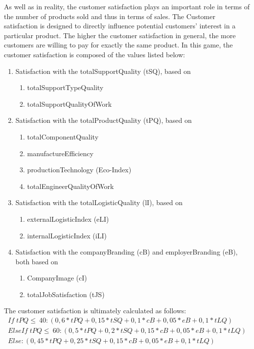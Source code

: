 As well as in reality, the customer satisfaction plays an important role in terms of the number of products sold and thus in terms of sales. %
The Customer satisfaction is designed to directly influence potential customers' interest in a particular product. The higher the customer satisfaction in general, the more customers are willing to pay for exactly the same product. 
In this game, the customer satisfaction is composed of the values listed below:
   \begin{enumerate}
      \item Satisfaction with the totalSupportQuality (tSQ), based on
      \begin{enumerate}
         \item totalSupportTypeQuality
         \item totalSupportQualityOfWork
      \end{enumerate}
      \item Satisfaction with the totalProductQuality (tPQ), based on
      \begin{enumerate}
         \item totalComponentQuality
         \item manufactureEfficiency
         \item productionTechnology (Eco-Index)
         \item totalEngineerQualityOfWork
      \end{enumerate}
      \item Satisfaction with the totalLogisticQuality (lI), based on
      \begin{enumerate}
         \item externalLogisticIndex (eLI)
         \item internalLogisticIndex (iLI)
      \end{enumerate}
      \item Satisfaction with the companyBranding (cB) and employerBranding (eB), both based on 
      \begin{enumerate}
          \item CompanyImage (cI)
          \item totalJobSatisfaction (tJS)
      \end{enumerate}
   \end{enumerate}
The customer satisfaction is ultimately calculated as follows:
    \begin{equation}
    \begin{aligned}
    If \; tPQ \leq \ 40: (0,6*tPQ + 0,15*tSQ + 0,1*cB + 0,05*eB + 0,1*tLQ)\\
    ElseIf \; tPQ \leq \ 60: (0,5*tPQ + 0,2*tSQ + 0,15*cB + 0,05*eB + 0,1*tLQ)\\
    Else: (0,45*tPQ + 0,25*tSQ + 0,15*cB + 0,05*eB + 0,1*tLQ)
    \end{aligned}
    \end{equation}

